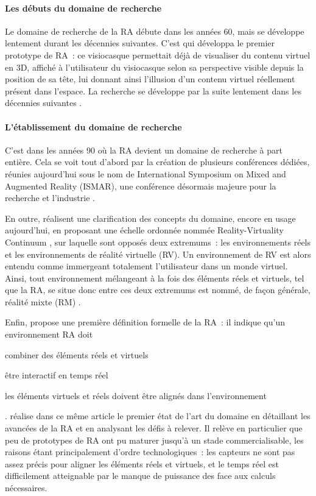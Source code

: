 \paragraph*{Les débuts du domaine de recherche}
Le domaine de recherche de la RA débute dans les années 60, mais se développe lentement durant les décennies suivantes. C'est \citet{Sutherland1968} qui développa le premier prototype de RA~: ce visiocasque permettait déjà de visualiser du contenu virtuel en 3D, affiché à l'utilisateur du visiocasque selon sa perspective visible depuis la position de sa tête, lui donnant ainsi l'illusion d'un contenu virtuel réellement présent dans l'espace. La recherche se développe par la suite lentement dans les décennies suivantes \citep{VanKrevelenPoelman2010} \citep{CarmignianiFurhtAnisettiEtAl2011}.

\paragraph*{L'établissement du domaine de recherche}
C'est dans les années 90 où la RA devient un domaine de recherche à part entière. Cela se voit tout d'abord par la création de plusieurs conférences dédiées, réunies aujourd'hui sous le nom de International Symposium on Mixed and Augmented Reality (ISMAR), une conférence désormais majeure pour la recherche et l'industrie \citep{AzumaBaillotBehringerEtAl2001}.

En outre, \citet{MilgramKishino1994} réalisent une clarification des concepts du domaine, encore en usage aujourd'hui, en proposant une échelle ordonnée nommée \foreignlanguage{english}{Reality-Virtuality Continuum} , sur laquelle sont opposés deux extremums~: les environnements réels et les environnements de réalité virtuelle (RV). Un environnement de RV est alors entendu comme immergeant totalement l'utilisateur dans un monde virtuel. Ainsi, tout environnement mélangeant à la fois des éléments réels et virtuels, tel que la RA, se situe donc entre ces deux extremums est nommé, de façon générale, réalité mixte (RM) \citep{MilgramKishino1994}.

Enfin, \citet{Azuma1997} propose une première définition formelle de la RA~: il indique qu'un environnement RA doit 
\begin{enumerate*}[label=\emph{\arabic*})]
	\item combiner des éléments réels et virtuels
	\item être interactif en temps réel
	\item les éléments virtuels et réels doivent être alignés dans l'environnement
\end{enumerate*}. 
\citeauthor{Azuma1997} réalise dans ce même article le premier état de l'art du domaine en détaillant les avancées de la RA et en analysant les défis à relever. Il relève en particulier que peu de prototypes de RA ont pu maturer jusqu'à un stade commercialisable, les raisons étant principalement d'ordre technologiques~: les capteurs ne sont pas assez précis pour aligner les éléments réels et virtuels, et le temps réel est difficilement atteignable par le manque de puissance des face aux calculs nécessaires.

